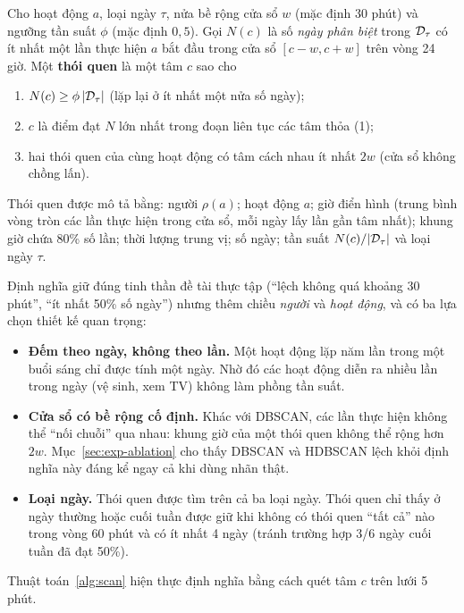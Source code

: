 \begin{definition}
\label{def:habit}
Cho hoạt động $a$, loại ngày $\tau$, nửa bề rộng cửa sổ $w$ (mặc định 30 phút) và ngưỡng tần suất
$\phi$ (mặc định $0{,}5$). Gọi $N(c)$ là số \emph{ngày phân biệt} trong $\mathcal{D}_\tau$ có ít nhất một lần
thực hiện $a$ bắt đầu trong cửa sổ $[c-w, c+w]$ trên vòng 24 giờ. Một \textbf{thói quen} là một tâm
$c$ sao cho
\begin{enumerate}
  \item $N(c) \ge \phi\,|\mathcal{D}_\tau|$ (lặp lại ở ít nhất một nửa số ngày);
  \item $c$ là điểm đạt $N$ lớn nhất trong đoạn liên tục các tâm thỏa (1);
  \item hai thói quen của cùng hoạt động có tâm cách nhau ít nhất $2w$ (cửa sổ không chồng lấn).
\end{enumerate}
Thói quen được mô tả bằng: người $\rho(a)$; hoạt động $a$; giờ điển hình (trung bình vòng tròn các
lần thực hiện trong cửa sổ, mỗi ngày lấy lần gần tâm nhất); khung giờ chứa 80\% số lần; thời lượng
trung vị; số ngày; tần suất $N(c)/|\mathcal{D}_\tau|$ và loại ngày $\tau$.
\end{definition}

Định nghĩa giữ đúng tinh thần đề tài thực tập (``lệch không quá khoảng 30 phút'', ``ít nhất 50\%
số ngày'') nhưng thêm chiều \emph{người} và \emph{hoạt động}, và có ba lựa chọn thiết kế quan trọng:

\begin{itemize}
  \item \textbf{Đếm theo ngày, không theo lần.} Một hoạt động lặp năm lần trong một buổi sáng chỉ được
  tính một ngày. Nhờ đó các hoạt động diễn ra nhiều lần trong ngày (vệ sinh, xem TV) không làm phồng
  tần suất.
  \item \textbf{Cửa sổ có bề rộng cố định.} Khác với DBSCAN, các lần thực hiện không thể ``nối
  chuỗi'' qua nhau: khung giờ của một thói quen không thể rộng hơn $2w$. Mục~\ref{sec:exp-ablation}
  cho thấy DBSCAN và HDBSCAN lệch khỏi định nghĩa này đáng kể ngay cả khi dùng nhãn thật.
  \item \textbf{Loại ngày.} Thói quen được tìm trên cả ba loại ngày. Thói quen chỉ thấy ở ngày thường
  hoặc cuối tuần được giữ khi không có thói quen ``tất cả'' nào trong vòng 60 phút và có ít nhất 4
  ngày (tránh trường hợp 3/6 ngày cuối tuần đã đạt 50\%).
\end{itemize}

Thuật toán~\ref{alg:scan} hiện thực định nghĩa bằng cách quét tâm $c$ trên lưới 5 phút.

